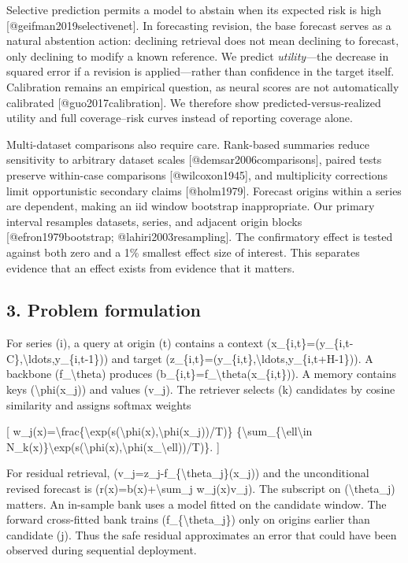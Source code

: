 \documentclass[
]{article}
\begin{document}
Selective prediction permits a model to abstain when its expected risk
is high {[}@geifman2019selectivenet{]}. In forecasting revision, the
base forecast serves as a natural abstention action: declining retrieval
does not mean declining to forecast, only declining to modify a known
reference. We predict \emph{utility}---the decrease in squared error if
a revision is applied---rather than confidence in the target itself.
Calibration remains an empirical question, as neural scores are not
automatically calibrated {[}@guo2017calibration{]}. We therefore show
predicted-versus-realized utility and full coverage--risk curves instead
of reporting coverage alone.

Multi-dataset comparisons also require care. Rank-based summaries reduce
sensitivity to arbitrary dataset scales {[}@demsar2006comparisons{]},
paired tests preserve within-case comparisons {[}@wilcoxon1945{]}, and
multiplicity corrections limit opportunistic secondary claims
{[}@holm1979{]}. Forecast origins within a series are dependent, making
an iid window bootstrap inappropriate. Our primary interval resamples
datasets, series, and adjacent origin blocks {[}@efron1979bootstrap;
@lahiri2003resampling{]}. The confirmatory effect is tested against both
zero and a 1\% smallest effect size of interest. This separates evidence
that an effect exists from evidence that it matters.

\subsection{3. Problem formulation}\label{3-problem-formulation}

For series (i), a query at origin (t) contains a context
(x\_\{i,t\}=(y\_\{i,t-C\},\textbackslash ldots,y\_\{i,t-1\})) and target
(z\_\{i,t\}=(y\_\{i,t\},\textbackslash ldots,y\_\{i,t+H-1\})). A
backbone (f\_\textbackslash theta) produces
(b\_\{i,t\}=f\_\textbackslash theta(x\_\{i,t\})). A memory contains keys
(\textbackslash phi(x\_j)) and values (v\_j). The retriever selects (k)
candidates by cosine similarity and assigns softmax weights

{[}
w\_j(x)=\textbackslash frac\{\textbackslash exp(s(\textbackslash phi(x),\textbackslash phi(x\_j))/T)\}
\{\textbackslash sum\_\{\textbackslash ell\textbackslash in
N\_k(x)\}\textbackslash exp(s(\textbackslash phi(x),\textbackslash phi(x\_\textbackslash ell))/T)\}.
{]}

For residual retrieval, (v\_j=z\_j-f\_\{\textbackslash theta\_j\}(x\_j))
and the unconditional revised forecast is
(r(x)=b(x)+\textbackslash sum\_j w\_j(x)v\_j). The subscript on
(\textbackslash theta\_j) matters. An in-sample bank uses a model fitted
on the candidate window. The forward cross-fitted bank trains
(f\_\{\textbackslash theta\_j\}) only on origins earlier than candidate
(j). Thus the safe residual approximates an error that could have been
observed during sequential deployment.
\end{document}
